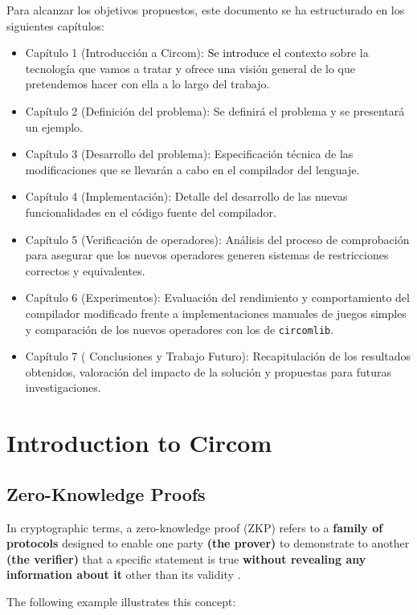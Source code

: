 \documentclass[a4paper,12pt]{report}
\begin{document}
	\noindent Para alcanzar los objetivos propuestos, este documento se ha estructurado en los siguientes capítulos:
	
	\begin{itemize}
		\item Capítulo 1 (Introducción a Circom): \textcolor{black}{Se introduce el} contexto sobre la tecnología que vamos a tratar y ofrece una visión general de lo que pretendemos hacer con ella a lo largo del trabajo.
		\item Capítulo 2 (Definición del problema): Se definirá el problema y se presentará un ejemplo.
		\item Capítulo 3 (Desarrollo del problema): Especificación técnica de las modificaciones que se llevarán a cabo en el compilador del lenguaje.
		\item Capítulo 4 (Implementación): Detalle del desarrollo de las nuevas funcionalidades en el código fuente del compilador.
		\item Capítulo 5 (Verificación de operadores): Análisis del proceso de comprobación para asegurar que los nuevos operadores generen sistemas de restricciones correctos y equivalentes.
		\item Capítulo 6 (Experimentos): Evaluación del rendimiento y comportamiento del compilador modificado frente a implementaciones manuales de juegos simples y comparación de los nuevos operadores con los de \texttt{circomlib}.
		\item Capítulo 7 ( Conclusiones y Trabajo Futuro): Recapitulación de los resultados obtenidos, valoración del impacto de la solución y propuestas para futuras investigaciones.
	\end{itemize}
	
	
	\chapter{Introduction to Circom}
	
	\section{Zero-Knowledge Proofs}
	\noindent In cryptographic terms, a zero-knowledge proof (ZKP) refers to a \textbf{family of protocols} designed to enable one party \textbf{(the prover)} to demonstrate to another \textbf{(the verifier)} that a specific statement is true \textbf{without revealing any information about it} other than its validity \cite{wiki_zkp}.
	
	\vspace{0.2cm}
	\noindent The following example illustrates this concept:
	
\end{document}
